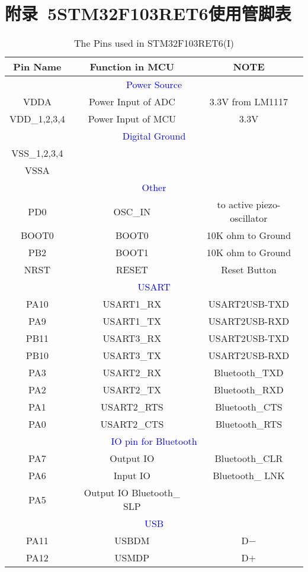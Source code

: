 \section*{附录~5\quad STM32F103RET6使用管脚表}
\begin{table}[!htd]
\begin{center}
\caption{The Pins used in STM32F103RET6(I) \label{PinUsedWirelessTrigger1}}

\noindent\begin{tabular}{|c|c|c|}
\hline
\textbf{Pin Name} & \textbf{Function in MCU}  & {\bfseries NOTE}  \\ \hline
\multicolumn{3}{|c|}{\textcolor{blue}{Power Source}}  \\ \hline
VDDA & Power Input of ADC & 3.3V from LM1117 \\ \hline
VDD\_{}1,2,3,4 & Power Input of MCU & 3.3V \\ \hline
\multicolumn{3}{|c|}{\textcolor{blue}{Digital Ground}}  \\ \hline
VSS\_{}1,2,3,4 & \rule{0pt}{1ex} &  \rule{0pt}{1ex} \\ \hline
VSSA &  \rule{0pt}{1ex} &  \rule{0pt}{1ex} \\ \hline
\multicolumn{3}{|c|}{\textcolor{blue}{Other}}  \\ \hline
PD0 & OSC\_{}IN	& to active piezo-oscillator\\ \hline
BOOT0 & BOOT0 & 10K ohm to Ground \\ \hline
PB2  & BOOT1  & 10K ohm to Ground \\ \hline
NRST & RESET &  Reset Button \\ \hline 
\multicolumn{3}{|c|}{\textcolor{blue}{USART}}  \\ \hline
PA10	& 	USART1\_{}RX	&	USART2USB-TXD  \\ \hline 
PA9	& 	USART1\_{}TX	&	USART2USB-RXD  \\ \hline 
PB11 	&	USART3\_{}RX	&	USART2USB-TXD  \\  \hline
PB10	& 	USART3\_{}TX	&	USART2USB-RXD  \\ \hline 
PA3  	&	USART2\_{}RX	&	Bluetooth\_{}TXD  \\ \hline
PA2  	&	USART2\_{}TX	&	Bluetooth\_{}RXD  \\ \hline
PA1	&	USART2\_{}RTS	&Bluetooth\_{}CTS\\   \hline
PA0  	&	USART2\_{}CTS	&Bluetooth\_{}RTS   \\  \hline
\multicolumn{3}{|c|}{\textcolor{blue}{IO pin for Bluetooth}}  \\ \hline
PA7	&	Output IO	&Bluetooth\_{}CLR	\\ 	\hline
PA6	&	Input IO	&Bluetooth\_ LNK  \\  \hline
PA5	&	Output IO	Bluetooth\_ SLP \\  \hline
\multicolumn{3}{|c|}{\textcolor{blue}{USB}}  \\ \hline
PA11	&	USBDM	& D$-$		\\  \hline 
PA12	&	USMDP	& D$+$		\\   \hline
\end{tabular}
\end{center}
\end{table}

